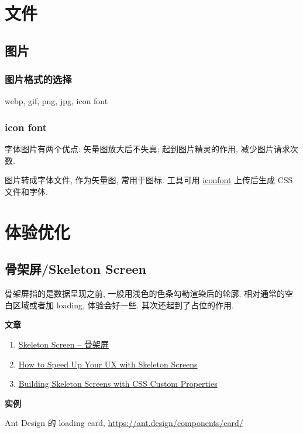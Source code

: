 \section{文件}\label{ux6587ux4ef6}

\subsection{图片}\label{ux56feux7247}

\subsubsection{图片格式的选择}\label{ux56feux7247ux683cux5f0fux7684ux9009ux62e9}

webp, gif, png, jpg, icon font

\subsubsection{icon font}\label{icon-font}

字体图片有两个优点: 矢量图放大后不失真; 起到图片精灵的作用,
减少图片请求次数.

图片转成字体文件, 作为矢量图, 常用于图标. 工具可用
\href{http://www.iconfont.cn/}{iconfont} 上传后生成 CSS 文件和字体.

\section{体验优化}\label{ux4f53ux9a8cux4f18ux5316}

\subsection{骨架屏/Skeleton
Screen}\label{ux9aa8ux67b6ux5c4fskeleton-screen}

骨架屏指的是数据呈现之前, 一般用浅色的色条勾勒渲染后的轮廓.
相对通常的空白区域或者加 loading, 体验会好一些. 其次还起到了占位的作用.

\textbf{文章}

\begin{enumerate}
\def\labelenumi{\arabic{enumi}.}
\tightlist
\item
  \href{http://www.bestvist.com/2018/01/19/skeleton-screen/}{Skeleton
  Screen -- 骨架屏}
\item
  \href{https://www.sitepoint.com/how-to-speed-up-your-ux-with-skeleton-screens/}{How
  to Speed Up Your UX with Skeleton Screens}
\item
  \href{https://css-tricks.com/building-skeleton-screens-css-custom-properties/}{Building
  Skeleton Screens with CSS Custom Properties}
\end{enumerate}

\textbf{实例}

Ant Design 的 loading card, \url{https://ant.design/components/card/}

